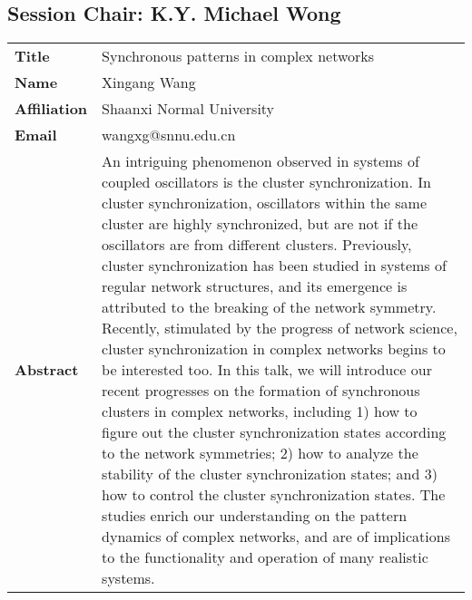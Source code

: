 \documentclass[oneside,A4paper,12pt]{article}
\begin{document}
\newpage
\subsection*{Session \uppercase\expandafter{}  \hspace{5mm} Chair: K.Y. Michael Wong}
\label{sec:org62b6c67}
\begin{longtable}{p{2cm}p{14cm}}
\toprule
\textbf{Title} & Synchronous patterns in complex networks\\
\textbf{Name} & Xingang Wang\\
\textbf{Affiliation} & Shaanxi Normal University\\
\textbf{Email} & wangxg@snnu.edu.cn\\
\textbf{Abstract} & An intriguing phenomenon observed in systems of coupled oscillators is the cluster synchronization. In cluster synchronization, oscillators within the same cluster are highly synchronized, but are not if the oscillators are from different clusters. Previously, cluster synchronization has been studied in systems of regular network structures, and its emergence is attributed to the breaking of the network symmetry. Recently, stimulated by the progress of network science, cluster synchronization in complex networks begins to be interested too. In this talk, we will introduce our recent progresses on the formation of synchronous clusters in complex networks, including 1) how to figure out the cluster synchronization states according to the network symmetries; 2) how to analyze the stability of the cluster synchronization states; and 3) how to control the cluster synchronization states. The studies enrich our understanding on the pattern dynamics of complex networks, and are of implications to the functionality and operation of many realistic systems.\\
\bottomrule
\end{longtable}
\end{document}
